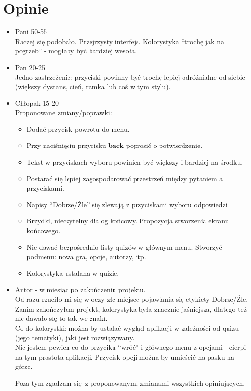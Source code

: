 \documentclass[12pt, a4paper]{article}
\begin{document}
\section{Opinie}
\begin{itemize}
\item Pani 50-55\\
Raczej się podobało. Przejrzysty interfejs. Kolorystyka ``trochę jak na pogrzeb'' - mogłaby być bardziej wesoła.
\item Pan 20-25\\
Jedno zastrzeżenie: przyciski powinny być trochę lepiej odróżnialne od siebie (większy dystans, cień, ramka lub coś w tym stylu).
\item Chłopak 15-20\\
Proponowane zmiany/poprawki:
\begin{itemize}
\item Dodać przycisk powrotu do menu.
\item Przy naciśnięciu przycisku \textbf{back} poprosić o potwierdzenie.
\item Tekst w przyciskach wyboru powinien być większy i bardziej na środku.
\item Postarać się lepiej zagospodarować przestrzeń między pytaniem a przyciskami.
\item Napisy ``Dobrze/Źle'' się zlewają z przyciskami wyboru odpowiedzi.
\item Brzydki, nieczytelny dialog końcowy. Propozycja stworzenia ekranu końcowego.
\item Nie dawać bezpośrednio listy quizów w głównym menu. Stworzyć podmenu: nowa gra, opcje, autorzy, itp.
\item Kolorystyka ustalana w quizie.
\end{itemize}
\item Autor - w miesiąc po zakończeniu projektu.\\
Od razu rzuciło mi się w oczy złe miejsce pojawiania się etykiety Dobrze/Źle. Zanim zakończyłem projekt, kolorystyka była znacznie jaśniejsza, dlatego też nie dawało się to tak we znaki.\\
Co do kolorystki: można by ustalać wygląd aplikacji w zależności od quizu (jego tematyki), jaki jest rozwiązywany.\\
Nie jestem pewien co do przyciku ``wróć'' i głównego menu z opcjami - cierpi na tym prostota aplikacji. Przycisk opcji można by umieścić na pasku na górze.

Poza tym zgadzam się z proponowanymi zmianami wszystkich opiniujących.
\end{itemize}
\newpage
\end{document}
